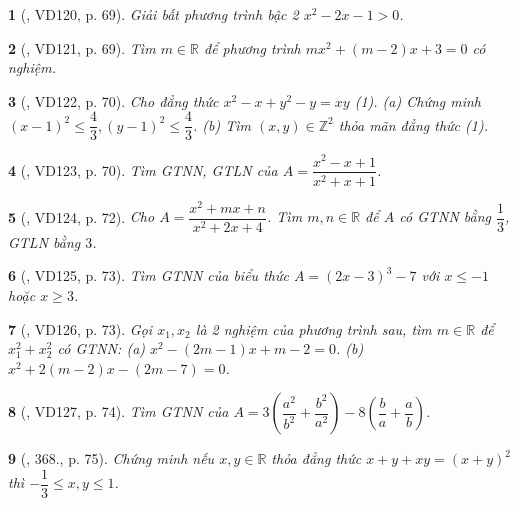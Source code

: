 \documentclass{article}
\newtheorem{baitoan}{}
\begin{document}
\begin{baitoan}[\cite{Binh_Toan_9_tap_2}, VD120, p. 69]
	Giải bất phương trình bậc 2 $x^2 - 2x - 1 > 0$.
\end{baitoan}

\begin{baitoan}[\cite{Binh_Toan_9_tap_2}, VD121, p. 69]
	Tìm $m\in\mathbb{R}$ để phương trình $mx^2 + (m - 2)x + 3 = 0$ có nghiệm.
\end{baitoan}

\begin{baitoan}[\cite{Binh_Toan_9_tap_2}, VD122, p. 70]
	Cho đẳng thức $x^2 - x + y^2 - y = xy$ {\rm(1)}. (a) Chứng minh $(x - 1)^2\le\dfrac{4}{3},(y - 1)^2\le\dfrac{4}{3}$. (b) Tìm $(x,y)\in\mathbb{Z}^2$ thỏa mãn đẳng thức {\rm(1)}.
\end{baitoan}

\begin{baitoan}[\cite{Binh_Toan_9_tap_2}, VD123, p. 70]
	Tìm {\rm GTNN, GTLN} của $A = \dfrac{x^2 - x + 1}{x^2 + x + 1}$.
\end{baitoan}

\begin{baitoan}[\cite{Binh_Toan_9_tap_2}, VD124, p. 72]
	Cho $A = \dfrac{x^2 + mx + n}{x^2 + 2x + 4}$. Tìm $m,n\in\mathbb{R}$ để $A$ có {\rm GTNN} bằng $\dfrac{1}{3}$, {\rm GTLN} bằng $3$.
\end{baitoan}

\begin{baitoan}[\cite{Binh_Toan_9_tap_2}, VD125, p. 73]
	Tìm {\rm GTNN} của biểu thức $A = (2x - 3)^3 - 7$ với $x\le-1$ hoặc $x\ge3$.
\end{baitoan}

\begin{baitoan}[\cite{Binh_Toan_9_tap_2}, VD126, p. 73]
	Gọi $x_1,x_2$ là 2 nghiệm của phương trình sau, tìm $m\in\mathbb{R}$ để $x_1^2 + x_2^2$ có {\rm GTNN}: (a) $x^2 - (2m - 1)x + m - 2 = 0$. (b) $x^2 + 2(m - 2)x - (2m - 7) = 0$.
\end{baitoan}

\begin{baitoan}[\cite{Binh_Toan_9_tap_2}, VD127, p. 74]
	Tìm {\rm GTNN} của $A = 3\left(\dfrac{a^2}{b^2} + \dfrac{b^2}{a^2}\right) - 8\left(\dfrac{b}{a} + \dfrac{a}{b}\right)$.
\end{baitoan}

\begin{baitoan}[\cite{Binh_Toan_9_tap_2}, 368., p. 75]
	Chứng minh nếu $x,y\in\mathbb{R}$ thỏa đẳng thức $x + y + xy = (x + y)^2$ thì $-\dfrac{1}{3}\le x,y\le1$.
\end{baitoan}
\end{document}
